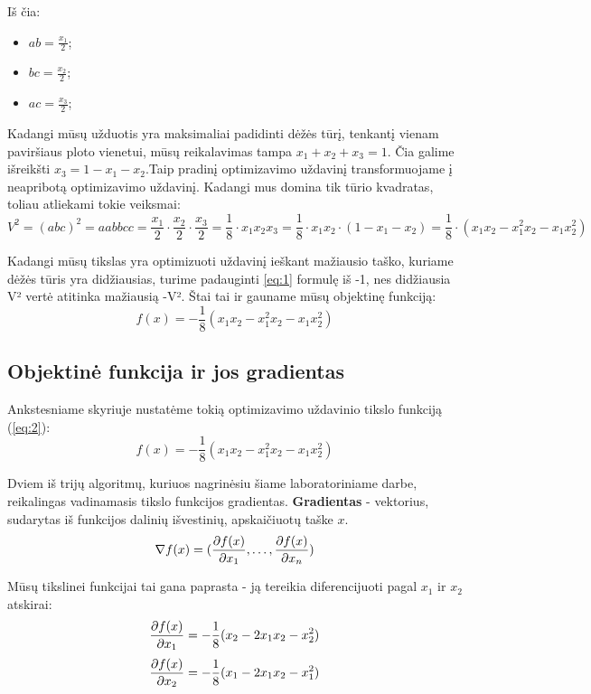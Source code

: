 \documentclass{article}
\begin{document}
Iš čia:
\begin{itemize}
    \item $ab = \frac{x_{1}}{2}$;
    \item $bc = \frac{x_{2}}{2}$;
    \item $ac = \frac{x_{3}}{2}$;
\end{itemize}

Kadangi mūsų užduotis yra maksimaliai padidinti dėžės tūrį, tenkantį vienam paviršiaus ploto vienetui, mūsų reikalavimas tampa $x_{1} + x_{2} + x_{3} = 1$. Čia galime išreikšti $x_{3} = 1 - x_{1} - x_{2}$.Taip pradinį optimizavimo uždavinį transformuojame į neapribotą optimizavimo uždavinį. Kadangi mus domina tik tūrio kvadratas, toliau atliekami tokie veiksmai:
\begin{equation}\label{eq:1}
    V^2 = (abc)^2 = aabbcc = \frac{x_{1}}{2}\cdot \frac{x_{2}}{2}\cdot \frac{x_{3}}{2} = \frac{1}{8}\cdot x_{1}x_{2}x_{3} = \frac{1}{8}\cdot x_{1}x_{2}\cdot (1-x_{1}-x_{2}) = \frac{1}{8}\cdot (x_{1}x_{2}-x_{1}^2x_{2}-x_{1}x_{2}^2)
\end{equation}

Kadangi mūsų tikslas yra optimizuoti uždavinį ieškant mažiausio taško, kuriame dėžės tūris yra didžiausias, turime padauginti \ref{eq:1} formulę iš -1, nes didžiausia V² vertė atitinka mažiausią -V². Štai tai ir gauname mūsų objektinę funkciją:
\begin{equation}\label{eq:2}
    f(x) = -\frac{1}{8}(x_{1}x_{2}-x_{1}^2x_{2}-x_{1}x_{2}^2)
\end{equation}
\subsection{Objektinė funkcija ir jos gradientas}
Ankstesniame skyriuje nustatėme tokią optimizavimo uždavinio tikslo funkciją (\ref{eq:2}):
\begin{equation*}
    f(x) = -\frac{1}{8}(x_{1}x_{2}-x_{1}^2x_{2}-x_{1}x_{2}^2)
\end{equation*}

Dviem iš trijų algoritmų, kuriuos nagrinėsiu šiame laboratoriniame darbe, reikalingas vadinamasis tikslo funkcijos gradientas. \textbf{Gradientas} - vektorius, sudarytas iš funkcijos dalinių išvestinių,
apskaičiuotų taške $x$.
\begin{equation*}
    \nabla f(x) = (\pdv{f(x)}{x_{1}},\dots,\pdv{f(x)}{x_{n}})
\end{equation*}

Mūsų tikslinei funkcijai tai gana paprasta - ją tereikia diferencijuoti pagal $x_{1}$ ir $x_{2}$ atskirai:
\begin{equation*}
    \pdv{f(x)}{x_{1}} = -\frac{1}{8}(x_{2}-2x_{1}x_{2}-x_{2}^2)
\end{equation*}
\begin{equation*}
    \pdv{f(x)}{x_{2}} = -\frac{1}{8}(x_{1}-2x_{1}x_{2}-x_{1}^2)
\end{equation*}
\end{document}

